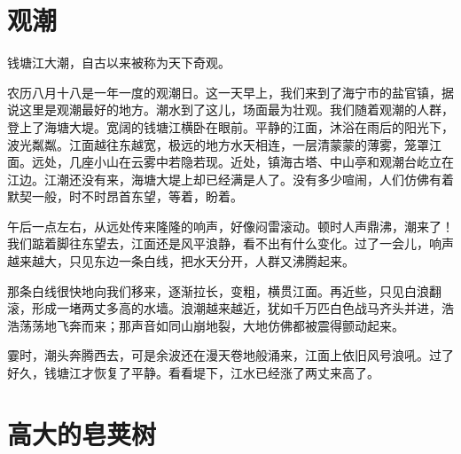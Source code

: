 \documentclass[12pt,UTF-8,openany]{ctexbook}
\begin{document}
\chapter{观潮}

\begin{large}
    
    钱塘江大潮，自古以来被称为天下奇观。
    
    农历八月十八是一年一度的观潮日。这一天早上，我们来到了海宁市的盐官镇，据说这里是观潮最好的地方。潮水到了这儿，场面最为壮观。我们随着观潮的人群，登上了海塘大堤。宽阔的钱塘江横卧在眼前。平静的江面，沐浴在雨后的阳光下，波光粼粼。江面越往东越宽，极远的地方水天相连，一层清蒙蒙的薄雾，笼罩江面。远处，几座小山在云雾中若隐若现。近处，镇海古塔、中山亭和观潮台屹立在江边。江潮还没有来，海塘大堤上却已经满是人了。没有多少喧闹，人们仿佛有着默契一般，时不时昂首东望，等着，盼着。
    
    午后一点左右，从远处传来隆隆的响声，好像闷雷滚动。顿时人声鼎沸，潮来了！我们踮着脚往东望去，江面还是风平浪静，看不出有什么变化。过了一会儿，响声越来越大，只见东边一条白线，把水天分开，人群又沸腾起来。
    
    那条白线很快地向我们移来，逐渐拉长，变粗，横贯江面。再近些，只见白浪翻滚，形成一堵两丈多高的水墙。浪潮越来越近，犹如千万匹白色战马齐头并进，浩浩荡荡地飞奔而来；那声音如同山崩地裂，大地仿佛都被震得颤动起来。
    
    霎时，潮头奔腾西去，可是余波还在漫天卷地般涌来，江面上依旧风号浪吼。过了好久，钱塘江才恢复了平静。看看堤下，江水已经涨了两丈来高了。
    
\end{large}



\chapter{高大的皂荚树}
\end{document}
